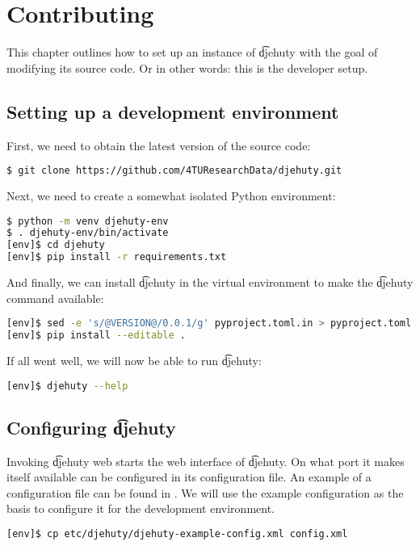 \chapter{Contributing}

This chapter outlines how to set up an instance of \t{djehuty} with the goal
of modifying its source code.  Or in other words: this is the developer setup.

\section{Setting up a development environment}

First, we need to obtain the latest version of the source code:
\begin{lstlisting}[language=bash]
$ git clone https://github.com/4TUResearchData/djehuty.git
\end{lstlisting}

Next, we need to create a somewhat isolated Python environment:
\begin{lstlisting}[language=bash]
$ python -m venv djehuty-env
$ . djehuty-env/bin/activate
[env]$ cd djehuty
[env]$ pip install -r requirements.txt
\end{lstlisting}

And finally, we can install \t{djehuty} in the virtual environment to make
the \t{djehuty} command available:
\begin{lstlisting}[language=bash]
[env]$ sed -e 's/@VERSION@/0.0.1/g' pyproject.toml.in > pyproject.toml
[env]$ pip install --editable .
\end{lstlisting}

If all went well, we will now be able to run \t{djehuty}:
\begin{lstlisting}[language=bash]
[env]$ djehuty --help
\end{lstlisting}

\section{Configuring \t{djehuty}}

Invoking \t{djehuty web} starts the web interface of \t{djehuty}.  On what
port it makes itself available can be configured in its configuration file.
An example of a configuration file can be found in
.  We will use the example
configuration as the basis to configure it for the development environment.

\begin{lstlisting}[language=bash]
[env]$ cp etc/djehuty/djehuty-example-config.xml config.xml
\end{lstlisting}

